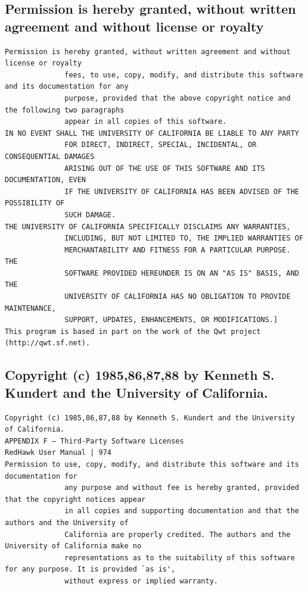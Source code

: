 \subsection{Permission is hereby granted, without written agreement and without license or royalty}

\begin{lstlisting}[basicstyle=\ttfamily\scriptsize,breaklines=true]
Permission is hereby granted, without written agreement and without license or royalty
              fees, to use, copy, modify, and distribute this software and its documentation for any
              purpose, provided that the above copyright notice and the following two paragraphs
              appear in all copies of this software.
IN NO EVENT SHALL THE UNIVERSITY OF CALIFORNIA BE LIABLE TO ANY PARTY
              FOR DIRECT, INDIRECT, SPECIAL, INCIDENTAL, OR CONSEQUENTIAL DAMAGES
              ARISING OUT OF THE USE OF THIS SOFTWARE AND ITS DOCUMENTATION, EVEN
              IF THE UNIVERSITY OF CALIFORNIA HAS BEEN ADVISED OF THE POSSIBILITY OF
              SUCH DAMAGE.
THE UNIVERSITY OF CALIFORNIA SPECIFICALLY DISCLAIMS ANY WARRANTIES,
              INCLUDING, BUT NOT LIMITED TO, THE IMPLIED WARRANTIES OF
              MERCHANTABILITY AND FITNESS FOR A PARTICULAR PURPOSE. THE
              SOFTWARE PROVIDED HEREUNDER IS ON AN "AS IS" BASIS, AND THE
              UNIVERSITY OF CALIFORNIA HAS NO OBLIGATION TO PROVIDE MAINTENANCE,
              SUPPORT, UPDATES, ENHANCEMENTS, OR MODIFICATIONS.]
This program is based in part on the work of the Qwt project (http://qwt.sf.net).
\end{lstlisting}

\subsection{Copyright (c) 1985,86,87,88 by Kenneth S. Kundert and the University of California.}

\begin{lstlisting}[basicstyle=\ttfamily\scriptsize,breaklines=true]
Copyright (c) 1985,86,87,88 by Kenneth S. Kundert and the University of California.
APPENDIX F — Third-Party Software Licenses                                     RedHawk User Manual | 974
Permission to use, copy, modify, and distribute this software and its documentation for
              any purpose and without fee is hereby granted, provided that the copyright notices appear
              in all copies and supporting documentation and that the authors and the University of
              California are properly credited. The authors and the University of California make no
              representations as to the suitability of this software for any purpose. It is provided `as is',
              without express or implied warranty.
\end{lstlisting}

